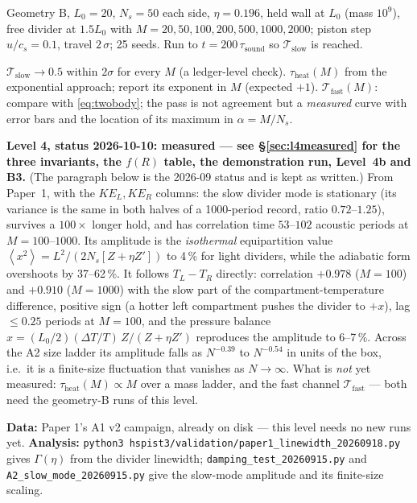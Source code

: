 \documentclass[11pt,a4paper]{article}
\newcommand{\avg}[1]{\left\langle #1 \right\rangle}
\newcommand{\ie}{i.e.\ }
\newcommand{\cmd}[1]{\texttt{\footnotesize #1}}
\begin{document}
\begin{run}
Geometry B, $L_0 = 20$, $N_s = 50$ each side, $\eta = 0.196$, held wall at $L_0$ (mass $10^9$), free divider at $1.5L_0$ with $M = 20, 50, 100, 200, 500, 1000, 2000$; piston step $u/c_s = 0.1$, travel $2\,\sigma$; 25 seeds. Run to $t = 200\,\tau_{\mathrm{sound}}$ so $\mathcal T_{\mathrm{slow}}$ is reached.
\end{run}
\begin{pass}
$\mathcal T_{\mathrm{slow}} \to 0.5$ within $2\sigma$ for every $M$ (a ledger-level check). $\tau_{\mathrm{heat}}(M)$ from the exponential approach; report its exponent in $M$ (expected $+1$). $\mathcal T_{\mathrm{fast}}(M)$: compare with \eqref{eq:twobody}; the pass is not agreement but a \emph{measured} curve with error bars and the location of its maximum in $\alpha = M/N_s$.
\end{pass}
\begin{res}
\textbf{Level 4, status 2026-10-10: measured --- see \S\ref{sec:l4measured} for the three invariants, the $f(R)$ table, the demonstration run, Level~4b and B3.} (The paragraph below is the 2026-09 status and is kept as written.)
From Paper~1, with the $KE_L, KE_R$ columns: the slow divider mode is stationary (its variance is the same in both halves of a 1000-period record, ratio $0.72$--$1.25$), survives a $100\times$ longer hold, and has correlation time $53$--$102$ acoustic periods at $M = 100$--$1000$. Its amplitude is the \emph{isothermal} equipartition value $\avg{x^2} = L^2/(2N_s[Z+\eta Z'])$ to 4\,\% for light dividers, while the adiabatic form overshoots by 37--62\,\%. It follows $T_L - T_R$ directly: correlation $+0.978$ ($M = 100$) and $+0.910$ ($M = 1000$) with the slow part of the compartment-temperature difference, positive sign (a hotter left compartment pushes the divider to $+x$), lag $\le 0.25$ periods at $M = 100$, and the pressure balance $x = (L_0/2)(\Delta T/T)\,Z/(Z+\eta Z')$ reproduces the amplitude to 6--7\,\%. Across the A2 size ladder its amplitude falls as $N^{-0.39}$ to $N^{-0.54}$ in units of the box, \ie it is a finite-size fluctuation that vanishes as $N\to\infty$. What is \emph{not} yet measured: $\tau_{\mathrm{heat}}(M)\propto M$ over a mass ladder, and the fast channel $\mathcal T_{\mathrm{fast}}$ --- both need the geometry-B runs of this level.
\end{res}

\begin{howto}
\textbf{Data:} Paper 1's A1 v2 campaign, already on disk --- this level needs no new runs yet.
\textbf{Analysis:} \cmd{python3 hspist3/validation/paper1\_linewidth\_20260918.py} gives $\Gamma(\eta)$ from the
divider linewidth; \cmd{damping\_test\_20260915.py} and \cmd{A2\_slow\_mode\_20260915.py} give the slow-mode
amplitude and its finite-size scaling.
\end{howto}
\end{document}
